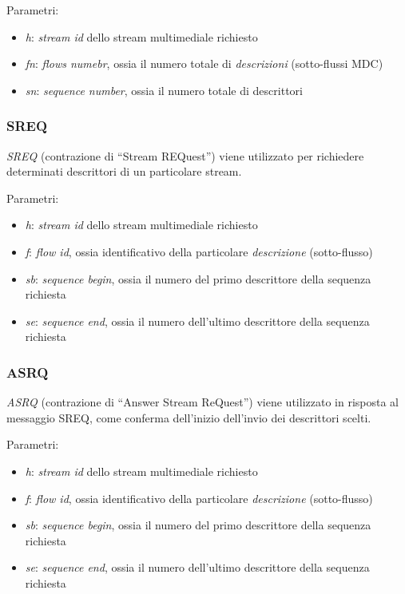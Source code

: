 Parametri:
\begin{itemize}
  \item \emph{h}: \emph{stream id} dello stream multimediale richiesto
  \item \emph{fn}: \emph{flows numebr}, ossia il numero totale di
  \emph{descrizioni} (sotto-flussi MDC)
  \item \emph{sn}: \emph{sequence number}, ossia il numero totale di descrittori
\end{itemize}


\subsubsection*{SREQ}
%
\emph{SREQ} (contrazione di ``Stream REQuest'') viene utilizzato per richiedere
determinati descrittori di un particolare stream.

Parametri:
\begin{itemize}
  \item \emph{h}: \emph{stream id} dello stream multimediale richiesto
  \item \emph{f}: \emph{flow id}, ossia identificativo della particolare
  \emph{descrizione} (sotto-flusso)
  \item \emph{sb}: \emph{sequence begin}, ossia il numero del primo descrittore
  della sequenza richiesta
  \item \emph{se}: \emph{sequence end}, ossia il numero dell'ultimo descrittore
  della sequenza richiesta
\end{itemize}


\subsubsection*{ASRQ}
%
\emph{ASRQ} (contrazione di ``Answer Stream ReQuest'') viene utilizzato in
risposta al messaggio SREQ, come conferma dell'inizio dell'invio dei
descrittori scelti. 

Parametri:
\begin{itemize}
  \item \emph{h}: \emph{stream id} dello stream multimediale richiesto
  \item \emph{f}: \emph{flow id}, ossia identificativo della particolare
  \emph{descrizione} (sotto-flusso)
  \item \emph{sb}: \emph{sequence begin}, ossia il numero del primo descrittore
  della sequenza richiesta
  \item \emph{se}: \emph{sequence end}, ossia il numero dell'ultimo descrittore
  della sequenza richiesta
\end{itemize}

